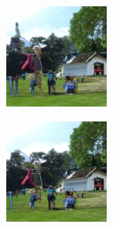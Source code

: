 \documentclass{article}
\begin{document}
\begin{figure}
\begin{subfigure}[b]{0.5\linewidth}
\begin{subfigure}[b]{0.242\linewidth}
        \end{subfigure}%
        \begin{subfigure}[b]{0.242\linewidth}
        \includegraphics[width=\linewidth]{figures/imagenet128/solver_samples/imagenet128_fm_ot_52_20.png}
        \end{subfigure}%
        \begin{subfigure}[b]{0.242\linewidth}
        \includegraphics[width=\linewidth]{figures/imagenet128/solver_samples/imagenet128_fm_ot_52_50.png}

\end{subfigure}
\end{subfigure}
\end{figure}
\end{document}
